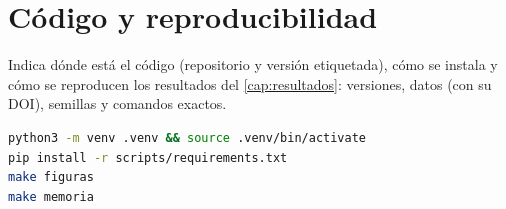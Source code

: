 \chapter{Código y reproducibilidad}\label{anx:codigo}

Indica dónde está el código (repositorio y versión etiquetada), cómo se
instala y cómo se reproducen los resultados del \cref{cap:resultados}:
versiones, datos (con su DOI), semillas y comandos exactos.

\begin{lstlisting}[language=bash, caption={Reproducción de las figuras de la memoria.}, label={lst:reproducir}]
python3 -m venv .venv && source .venv/bin/activate
pip install -r scripts/requirements.txt
make figuras
make memoria
\end{lstlisting}
